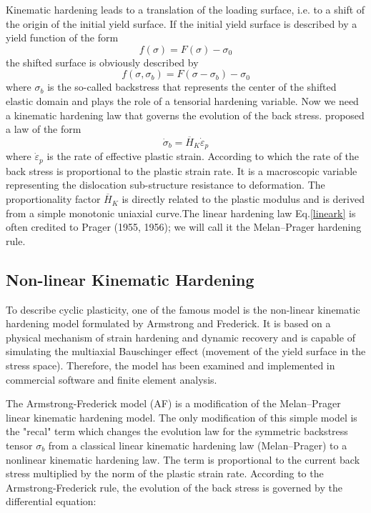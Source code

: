 Kinematic hardening leads to a translation of the loading surface, i.e. to a shift of
the origin of the initial yield surface. If the initial yield surface is described by a yield
function of the form
$$f(\sigma) = F(\sigma) -\sigma_0 $$
the shifted surface is obviously described by
$$f(\sigma,\sigma_b ) = F(\sigma-\sigma_b ) -\sigma_0$$
where $\sigma_b$ is the so-called backstress that represents the center of the shifted elastic
domain and plays the role of a tensorial hardening variable. Now we need a kinematic
hardening law that governs the evolution of the back stress. \cite{melan1938plastizitat} proposed
a law of the form
\begin{equation}
\dot{\sigma}_b =\overline{H}_K \dot{\varepsilon}_p
\label{lineark}
\end{equation}
where $ \dot{\varepsilon}_p$ is the rate of effective plastic strain. According to which the rate of the back stress is proportional to the plastic strain rate. It is a macroscopic variable representing the
dislocation sub-structure resistance to deformation. 
The proportionality factor $\overline{H}_K$ is directly related to the plastic modulus and is derived from a simple
monotonic uniaxial curve.The linear hardening law Eq.\eqref{lineark} is often credited to Prager (1955, 1956); we will call it the Melan–Prager hardening rule. 
\subsection{Non-linear Kinematic Hardening}
To describe cyclic plasticity, one of the famous model is the non-linear kinematic hardening model formulated by Armstrong and Frederick. It is based on a physical mechanism of strain hardening and dynamic recovery and is capable of simulating the
multiaxial Bauschinger effect (movement of the yield surface in the stress space). Therefore, the model has been examined and implemented in commercial software and finite element analysis.

The Armstrong-Frederick model (AF) is a modification of the Melan–Prager linear kinematic hardening model. The only modification of this simple model is the "recal" term which changes the evolution law for the symmetric backstress tensor $\sigma_b$ from a classical linear kinematic hardening law (Melan–Prager) to a nonlinear kinematic hardening law. The term is proportional to the current back stress multiplied by the norm of the plastic strain rate. According to the Armstrong-Frederick rule, the evolution of the
back stress is governed by the differential equation:

